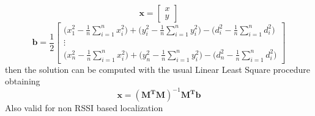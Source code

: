 \documentclass[12pt,twoside]{report}
\begin{document}
$$
\mathbf{x}=\begin{bmatrix}
    x\\
    y
\end{bmatrix}
$$
$$\mathbf{b}=\frac{1}{2}
\begin{bmatrix}
\bigg(x_1^2-\frac{1}{n}\sum_{i=1}^nx^2_i\bigg)+\bigg(y_i^2-\frac{1}{n}\sum_{i=1}^ny^2_i\bigg)-\bigg(d_i^2-\frac{1}{n}\sum_{i=1}^nd_i^2\bigg)\\
\vdots\\
\bigg(x_n^2-\frac{1}{n}\sum_{i=1}^nx^2_i\bigg)+\bigg(y_n^2-\frac{1}{n}\sum_{i=1}^ny^2_i\bigg)-\bigg(d_n^2-\frac{1}{n}\sum_{i=1}^nd_i^2\bigg)
\end{bmatrix}
$$
then the solution can be computed with the usual Linear Least Square procedure obtaining
\begin{equation}
    \mathbf{x}=(\mathbf{M^TM})^{-1}\mathbf{M^Tb}
\end{equation}
Also valid for non RSSI based localization
\clearpage
\end{document}
